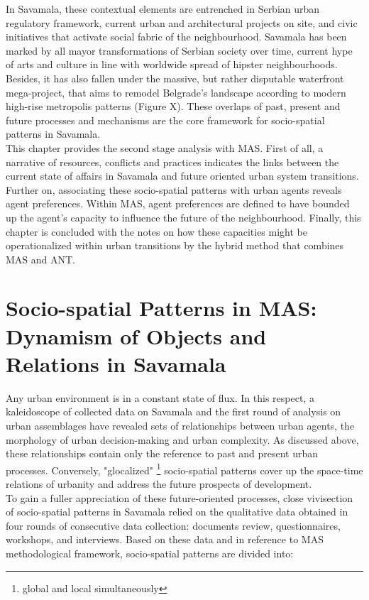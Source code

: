 \documentclass[11pt]{report}
\begin{document}
In Savamala, these contextual elements are entrenched in Serbian urban regulatory framework, current urban and architectural projects on site, and civic initiatives that activate social fabric of the neighbourhood.
Savamala has been marked by all mayor transformations of Serbian society over time, current hype of arts and culture in line with worldwide spread of hipster neighbourhoods.
Besides, it has also fallen under the massive, but rather disputable waterfront mega-project, that aims to remodel Belgrade's landscape according to modern high-rise metropolis patterns (Figure X). %
These overlaps of past, present and future processes and mechanisms are the core framework for socio-spatial patterns in Savamala.
\\

This chapter provides the second stage analysis with MAS. 
First of all, a narrative of resources, conflicts and practices indicates the links between the current state of affairs in Savamala and future oriented urban system transitions. 
Further on, associating these socio-spatial patterns with urban agents reveals agent preferences.
Within MAS, agent preferences are defined to have bounded up the agent's capacity to influence the future of the neighbourhood.
Finally, this chapter is concluded with the notes on how these capacities might be operationalized within urban transitions by the hybrid method that combines MAS and ANT.

\section{Socio-spatial Patterns in MAS: Dynamism of Objects and Relations in Savamala}

Any urban environment is in a constant state of flux.
In this respect, a kaleidoscope of collected data on Savamala and the first round of analysis on urban assemblages have revealed sets of relationships between urban agents, the morphology of urban decision-making and urban complexity.
As discussed above, these relationships contain only the reference to past and present urban processes.
Conversely, "glocalized"
\footnote{global and local simultaneously}
socio-spatial patterns cover up the space-time relations of urbanity and address the future prospects of development.
\\

To gain a fuller appreciation of these future-oriented processes, close vivisection of socio-spatial patterns in Savamala relied on the qualitative data obtained in four rounds of consecutive data collection:
documents review, questionnaires, workshops, and interviews.
Based on these data and in reference to MAS methodological framework, socio-spatial patterns are divided into:
\end{document}
